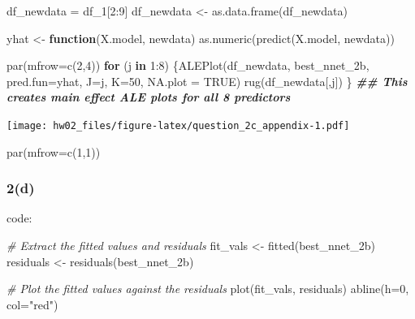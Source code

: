 \documentclass[
]{article}
\newenvironment{Shaded}{\begin{snugshade}}{\end{snugshade}}
\newcommand{\AttributeTok}[1]{\textcolor[rgb]{0.77,0.63,0.00}{#1}}
\newcommand{\CommentTok}[1]{\textcolor[rgb]{0.56,0.35,0.01}{\textit{#1}}}
\newcommand{\ConstantTok}[1]{\textcolor[rgb]{0.00,0.00,0.00}{#1}}
\newcommand{\ControlFlowTok}[1]{\textcolor[rgb]{0.13,0.29,0.53}{\textbf{#1}}}
\newcommand{\DecValTok}[1]{\textcolor[rgb]{0.00,0.00,0.81}{#1}}
\newcommand{\DocumentationTok}[1]{\textcolor[rgb]{0.56,0.35,0.01}{\textbf{\textit{#1}}}}
\newcommand{\FunctionTok}[1]{\textcolor[rgb]{0.00,0.00,0.00}{#1}}
\newcommand{\NormalTok}[1]{#1}
\newcommand{\OtherTok}[1]{\textcolor[rgb]{0.56,0.35,0.01}{#1}}
\newcommand{\SpecialCharTok}[1]{\textcolor[rgb]{0.00,0.00,0.00}{#1}}
\newcommand{\StringTok}[1]{\textcolor[rgb]{0.31,0.60,0.02}{#1}}
\begin{document}
\begin{Shaded}
\begin{Highlighting}[]
\NormalTok{df\_newdata }\OtherTok{=}\NormalTok{ df\_1[}\DecValTok{2}\SpecialCharTok{:}\DecValTok{9}\NormalTok{]}
\NormalTok{df\_newdata }\OtherTok{\textless{}{-}} \FunctionTok{as.data.frame}\NormalTok{(df\_newdata)}

\NormalTok{yhat }\OtherTok{\textless{}{-}} \ControlFlowTok{function}\NormalTok{(X.model, newdata) }\FunctionTok{as.numeric}\NormalTok{(}\FunctionTok{predict}\NormalTok{(X.model, newdata))}

\FunctionTok{par}\NormalTok{(}\AttributeTok{mfrow=}\FunctionTok{c}\NormalTok{(}\DecValTok{2}\NormalTok{,}\DecValTok{4}\NormalTok{))}
\ControlFlowTok{for}\NormalTok{ (j }\ControlFlowTok{in} \DecValTok{1}\SpecialCharTok{:}\DecValTok{8}\NormalTok{)  \{}\FunctionTok{ALEPlot}\NormalTok{(df\_newdata, best\_nnet\_2b, }\AttributeTok{pred.fun=}\NormalTok{yhat, }\AttributeTok{J=}\NormalTok{j, }\AttributeTok{K=}\DecValTok{50}\NormalTok{, }\AttributeTok{NA.plot =} \ConstantTok{TRUE}\NormalTok{)}
  \FunctionTok{rug}\NormalTok{(df\_newdata[,j]) \}  }\DocumentationTok{\#\# This creates main effect ALE plots for all 8 predictors}
\end{Highlighting}
\end{Shaded}

\texttt{[image: hw02\_files/figure-latex/question\_2c\_appendix-1.pdf]}

\begin{Shaded}
\begin{Highlighting}[]
\FunctionTok{par}\NormalTok{(}\AttributeTok{mfrow=}\FunctionTok{c}\NormalTok{(}\DecValTok{1}\NormalTok{,}\DecValTok{1}\NormalTok{))}
\end{Highlighting}
\end{Shaded}

\hypertarget{d-3}{%
\subsubsection{2(d)}\label{d-3}}

code:

\begin{Shaded}
\begin{Highlighting}[]
\CommentTok{\# Extract the fitted values and residuals}
\NormalTok{fit\_vals }\OtherTok{\textless{}{-}} \FunctionTok{fitted}\NormalTok{(best\_nnet\_2b)}
\NormalTok{residuals }\OtherTok{\textless{}{-}} \FunctionTok{residuals}\NormalTok{(best\_nnet\_2b)}

\CommentTok{\# Plot the fitted values against the residuals}
\FunctionTok{plot}\NormalTok{(fit\_vals, residuals)}
\FunctionTok{abline}\NormalTok{(}\AttributeTok{h=}\DecValTok{0}\NormalTok{, }\AttributeTok{col=}\StringTok{"red"}\NormalTok{)}
\end{Highlighting}
\end{Shaded}
\end{document}
